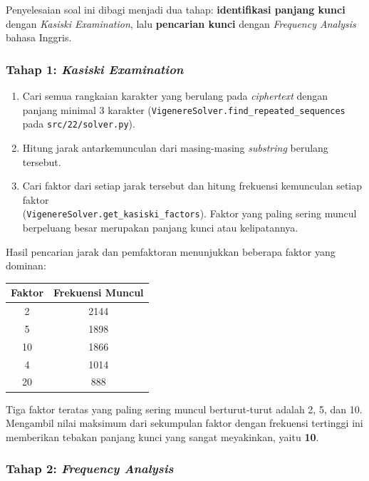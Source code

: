 Penyelesaian soal ini dibagi menjadi dua tahap: \textbf{identifikasi panjang kunci} dengan \textit{Kasiski Examination}, lalu \textbf{pencarian kunci} dengan \textit{Frequency Analysis} bahasa Inggris.

\subsubsection*{Tahap 1: \textit{Kasiski Examination}}

\begin{enumerate}
  \item Cari semua rangkaian karakter yang berulang pada \textit{ciphertext} dengan panjang minimal 3 karakter (\texttt{VigenereSolver.find\_repeated\_sequences} pada \texttt{src/22/solver.py}).
  \item Hitung jarak antarkemunculan dari masing-masing \textit{substring} berulang tersebut.
  \item Cari faktor dari setiap jarak tersebut dan hitung frekuensi kemunculan setiap faktor \\
  (\texttt{VigenereSolver.get\_kasiski\_factors}). Faktor yang paling sering muncul berpeluang besar merupakan panjang kunci atau kelipatannya.
\end{enumerate}

Hasil pencarian jarak dan pemfaktoran menunjukkan beberapa faktor yang dominan:

\begin{center}
  \small
  \begin{tabular}{|c|c|}
    \hline
    Faktor & Frekuensi Muncul \\
    \hline
    2 & 2144 \\
    5 & 1898 \\
    10 & 1866 \\
    4 & 1014 \\
    20 & 888 \\
    \hline
  \end{tabular}
\end{center}

Tiga faktor teratas yang paling sering muncul berturut-turut adalah 2, 5, dan 10. Mengambil nilai maksimum dari sekumpulan faktor dengan frekuensi tertinggi ini memberikan tebakan panjang kunci yang sangat meyakinkan, yaitu \textbf{10}.

\subsubsection*{Tahap 2: \textit{Frequency Analysis}}

